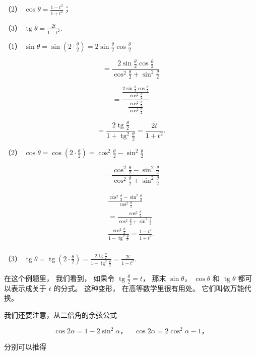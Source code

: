 （2） \(\cos \theta = \frac{1 - t^2}{1 + t^2}\)；

（3） \(\operatorname{tg} \theta = \frac{2t}{1 - t^2}\).

 （1）
\(\sin \theta = \sin \left(2 \cdot \frac{\theta}{2}\right) = 2 \sin \frac{\theta}{2} \cos \frac{\theta}{2}\)

\[
= \frac {2 \sin \frac {\theta}{2} \cos \frac {\theta}{2}}{\cos^ {2} \frac {\theta}{2} + \sin^ {2} \frac {\theta}{2}}
\]

\[
= \frac {\frac {2 \sin \frac {\theta}{2} \cos \frac {\theta}{2}}{\cos^ {2} \frac {\theta}{2}}}{\frac {\cos^ {2} \frac {\theta}{2}}{\cos^ {2} \frac {\theta}{2}}}
\]

\[
= \frac {2 \operatorname{tg} \frac {\theta}{2}}{1 + \operatorname{tg} ^ {2} \frac {\theta}{2}} = \frac {2 t}{1 + t ^ {2}}.
\]

（2）
\(\cos \theta = \cos \left(2 \cdot \frac{\theta}{2}\right) = \cos^2 \frac{\theta}{2} - \sin^2 \frac{\theta}{2}\)

\[
= \frac {\cos^ {2} \frac {\theta}{2} - \sin^ {2} \frac {\theta}{2}}{\cos^ {2} \frac {\theta}{2} + \sin^ {2} \frac {\theta}{2}}
\]

\[
\begin{array}{l} \frac {\cos^ {2} \frac {\theta}{2} - \sin^ {2} \frac {\theta}{2}}{\cos^ {2} \frac {\theta}{2}} \\ = \frac {\cos^ {2} \frac {\theta}{2}}{\cos^ {2} \frac {\theta}{2} + \sin^ {2} \frac {\theta}{2}} \\ \frac {\cos^ {2} \frac {\theta}{2}}{1 - \operatorname{tg} ^ {2} \frac {\theta}{2}} = \frac {1 - t ^ {2}}{1 + t ^ {2}}. \\ \end{array}
\]

（3）
\(\operatorname{tg} \theta = \operatorname{tg}\left(2 \cdot \frac{\theta}{2}\right) = \frac{2 \operatorname{tg} \frac{\theta}{2}}{1 - \operatorname{tg}^2 \frac{\theta}{2}} = \frac{2t}{1 - t^2}\).

在这个例题里， 我们看到， 如果令
\(\operatorname{tg} \frac{\theta}{2} = t\)， 那末 \(\sin \theta\)，
\(\cos \theta\) 和 \(\operatorname{tg} \theta\) 都可以表示成关于 \(t\)
的分式。 这种变形， 在高等数学里很有用处。 它们叫做万能代换。

我们还要注意，从二倍角的余弦公式

\[
\cos 2 \alpha = 1 - 2 \sin^ {2} \alpha \text{，} \quad \cos 2 \alpha = 2 \cos^ {2} \alpha - 1\text{，}
\]

分别可以推得

